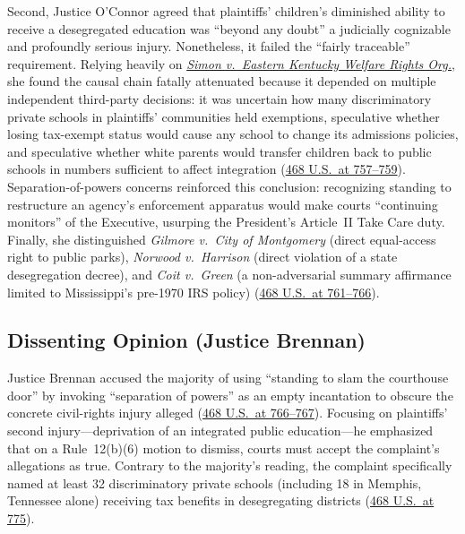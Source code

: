 \documentclass[12pt]{article}
\begin{document}
Second, Justice O'Connor agreed that plaintiffs' children's diminished ability to receive a desegregated education was ``beyond any doubt'' a judicially cognizable and profoundly serious injury. Nonetheless, it failed the ``fairly traceable'' requirement. Relying heavily on \href{https://supreme.justia.com/cases/federal/us/426/26/}{\textit{Simon v.\ Eastern Kentucky Welfare Rights Org.}}, she found the causal chain fatally attenuated because it depended on multiple independent third-party decisions: it was uncertain how many discriminatory private schools in plaintiffs' communities held exemptions, speculative whether losing tax-exempt status would cause any school to change its admissions policies, and speculative whether white parents would transfer children back to public schools in numbers sufficient to affect integration (\href{https://supreme.justia.com/cases/federal/us/468/737/}{468 U.S.\ at 757--759}). Separation-of-powers concerns reinforced this conclusion: recognizing standing to restructure an agency's enforcement apparatus would make courts ``continuing monitors'' of the Executive, usurping the President's Article~II Take Care duty. Finally, she distinguished \textit{Gilmore v.\ City of Montgomery} (direct equal-access right to public parks), \textit{Norwood v.\ Harrison} (direct violation of a state desegregation decree), and \textit{Coit v.\ Green} (a non-adversarial summary affirmance limited to Mississippi's pre-1970 IRS policy) (\href{https://supreme.justia.com/cases/federal/us/468/737/}{468 U.S.\ at 761--766}).

\subsection{Dissenting Opinion (Justice Brennan)}
Justice Brennan accused the majority of using ``standing to slam the courthouse door'' by invoking ``separation of powers'' as an empty incantation to obscure the concrete civil-rights injury alleged (\href{https://supreme.justia.com/cases/federal/us/468/737/}{468 U.S.\ at 766--767}). Focusing on plaintiffs' second injury---deprivation of an integrated public education---he emphasized that on a Rule~12(b)(6) motion to dismiss, courts must accept the complaint's allegations as true. Contrary to the majority's reading, the complaint specifically named at least 32 discriminatory private schools (including 18 in Memphis, Tennessee alone) receiving tax benefits in desegregating districts (\href{https://supreme.justia.com/cases/federal/us/468/737/}{468 U.S.\ at 775}).
\end{document}
